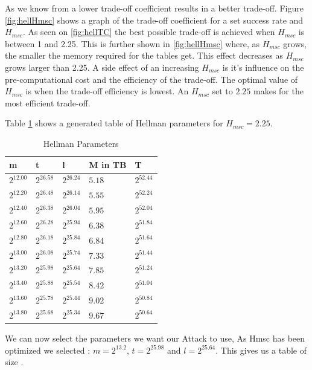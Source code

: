 As we know from \cite{176} a lower trade-off coefficient results in a
better trade-off. Figure \ref{fig:hellHmsc} shows a graph of the
trade-off coefficient for a set success rate and $H_{msc}$.
As seen on \ref{fig:hellTC} the best possible trade-off is achieved
when $H_{msc}$ is between 1 and 2.25. This is further shown in
\ref{fig:hellHmsc} where, as $H_{msc}$ grows, the smaller the memory
required for the tables get. This effect decreases as $H_{msc}$ grows
larger than 2.25. A side effect of an increasing $H_{msc}$ is it's
influence on the pre-computational cost and the efficiency of the
trade-off. The optimal value of $H_{msc}$ is when the trade-off
efficiency is lowest. An $H_{msc}$ set to $2.25$ makes for the most
efficient trade-off.

Table \ref{tab:hellparam} shows a generated table of Hellman
parameters for $H_{msc} =2.25$.
\begin{table}[H]
  \centering
\begin{tabular}{lllll}
m & t & l & M in TB & T \\\hline
$2^{12.00}$ & $2^{26.58}$ & $2^{26.24}$ & $5.18$ & $2^{52.44}$ \\
$2^{12.20}$ & $2^{26.48}$ & $2^{26.14}$ & $5.55$ & $2^{52.24}$ \\
$2^{12.40}$ & $2^{26.38}$ & $2^{26.04}$ & $5.95$ & $2^{52.04}$ \\
$2^{12.60}$ & $2^{26.28}$ & $2^{25.94}$ & $6.38$ & $2^{51.84}$ \\
$2^{12.80}$ & $2^{26.18}$ & $2^{25.84}$ & $6.84$ & $2^{51.64}$ \\
$2^{13.00}$ & $2^{26.08}$ & $2^{25.74}$ & $7.33$ & $2^{51.44}$ \\
$2^{13.20}$ & $2^{25.98}$ & $2^{25.64}$ & $7.85$ & $2^{51.24}$ \\
$2^{13.40}$ & $2^{25.88}$ & $2^{25.54}$ & $8.42$ & $2^{51.04}$ \\
$2^{13.60}$ & $2^{25.78}$ & $2^{25.44}$ & $9.02$ & $2^{50.84}$ \\
$2^{13.80}$ & $2^{25.68}$ & $2^{25.34}$ & $9.67$ & $2^{50.64}$ \\
\end{tabular}
  \caption{Hellman Parameters}
  \label{tab:hellparam}
\end{table}
We can now select the parameters we want our Attack to use, As Hmsc has been optimized we selected : $m=2^{13.2}$, $t=2^{25.98}$ and $l=2^{25.64}$.
This gives us a table of size .
